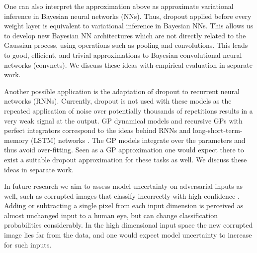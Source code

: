 \documentclass{article} %
\theoremstyle{definition}
\begin{document}
One can also interpret the approximation above as approximate variational inference in Bayesian neural networks (NNs). Thus, dropout applied before every weight layer is equivalent to variational inference in Bayesian NNs. This allows us to develop new Bayesian NN architectures which are not directly related to the Gaussian process, using operations such as pooling and convolutions. This leads to good, efficient, and trivial approximations to Bayesian convolutional neural networks (convnets). We discuss these ideas with empirical evaluation in separate work.

Another possible application is the adaptation of dropout to recurrent neural networks (RNNs). Currently, dropout is not used with these models as the repeated application of noise over potentially thousands of repetitions results in a very weak signal at the output. GP dynamical models \citep{wang2005gaussian} and recursive GPs with perfect integrators correspond to the ideas behind RNNs and long-short-term-memory (LSTM) networks \citep{hochreiter1997long}. The GP models integrate over the parameters and thus avoid over-fitting. Seen as a GP approximation one would expect there to exist a suitable dropout approximation for these tasks as well. We discuss these ideas in separate work.



In future research we aim to assess model uncertainty on adversarial inputs as well, such as corrupted images that classify incorrectly with high confidence \citep{szegedy2013intriguing}. Adding or subtracting a single pixel from each input dimension is perceived as almost unchanged input to a human eye, but can change classification probabilities considerably. In the high dimensional input space the new corrupted image lies far from the data, and one would expect model uncertainty to increase for such inputs.
\end{document}
